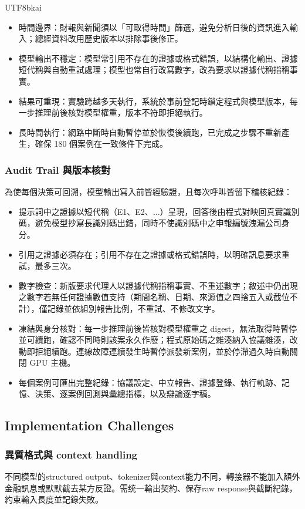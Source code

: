 \documentclass[12pt,a4paper]{article}
\begin{document}
\begin{CJK}{UTF8}{bkai}
\begin{itemize}
  \item 時間邊界：財報與新聞須以「可取得時間」篩選，避免分析日後的資訊進入輸入；總經資料改用歷史版本以排除事後修正。
  \item 模型輸出不穩定：模型常引用不存在的證據或格式錯誤，以結構化輸出、證據短代稱與自動重試處理；模型也常自行改寫數字，改為要求以證據代稱指稱事實。
  \item 結果可重現：實驗跨越多天執行，系統於事前登記時鎖定程式與模型版本，每一步推理前後核對模型權重，版本不符即拒絕執行。
  \item 長時間執行：網路中斷時自動暫停並於恢復後續跑，已完成之步驟不重新產生，確保 180 個案例在一致條件下完成。
\end{itemize}
\subsubsection{Audit Trail 與版本核對}
為使每個決策可回溯，模型輸出寫入前皆經驗證，且每次呼叫皆留下稽核紀錄：

\begin{itemize}
  \item 提示詞中之證據以短代稱（E1、E2、$\ldots$）呈現，回答後由程式對映回真實識別碼，避免模型抄寫長識別碼出錯，同時不使識別碼中之申報編號洩漏公司身分。
  \item 引用之證據必須存在；引用不存在之證據或格式錯誤時，以明確訊息要求重試，最多三次。
  \item 數字檢查：新版要求代理人以證據代稱指稱事實、不重述數字；敘述中仍出現之數字若無任何證據數值支持（期間名稱、日期、來源值之四捨五入或截位不計），僅記錄並依組別報告比例，不重試、不修改文字。
  \item 凍結與身分核對：每一步推理前後皆核對模型權重之 digest，無法取得時暫停並可續跑，確認不同時則該案永久作廢；程式原始碼之雜湊納入協議雜湊，改動即拒絕續跑。連線故障連續發生時暫停派發新案例，並於停滯過久時自動關閉 GPU 主機。
  \item 每個案例可匯出完整紀錄：協議設定、中立報告、證據登錄、執行軌跡、記憶、決策、逐案例回測與彙總指標，以及辯論逐字稿。
\end{itemize}
\subsection{Implementation Challenges}

\subsubsection{異質格式與 context handling}
不同模型的structured output、tokenizer與context能力不同，轉接器不能加入額外金融訊息或默默截去某方反證。需统一輸出契約、保存raw response與截斷紀錄，約束輸入長度並記錄失敗。


\end{CJK}
\end{document}

